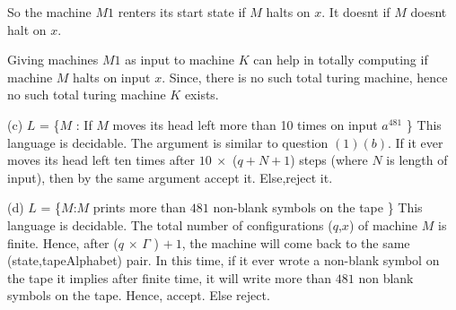 \documentclass[addpoints,12pt]{exam}
\begin{document}
\begin{questions}
\begin{itemize}
	\end{itemize}
	So the machine $M1$ renters its start state if $M$ halts on $x$. It doesnt if $M$ doesnt halt on $x$.

      Giving machines $M1$ as input to machine $K$ can help in totally computing if machine $M$ halts on input $x$. Since, there is no such total turing machine, hence no such total turing machine $K$ exists.
      \newline
      
      (c) \quad $L$ = \{$M$ : If $M$ moves its head left more than 10 times on input $a^{481}$ \} \newline
	This language is decidable. The argument is similar to question $(1)(b)$. If it ever moves its head left ten times after $10~\times $ ($q + N + 1$) steps (where $N$ is length of input), then
	by the same argument accept it. Else,reject it.
	\newline
	
      (d) \quad $L$ = \{$M$:$M$ prints more than $481$ non-blank symbols on the tape \} \newline
      This language is decidable. The total number of configurations ($q$,$x$) of machine $M$ is finite. Hence, after (\textbar $q$ \textbar $\times$ \textbar $\Gamma$ \textbar) $+~1$, the machine
      will come back to the same (state,tapeAlphabet) pair. In this time, if it ever wrote a non-blank symbol on the tape it implies after finite time, it will write more than $481$ non blank symbols on the tape.
      Hence, accept. Else reject.
      \newline
      
 \question
\end{questions}
\end{document}
